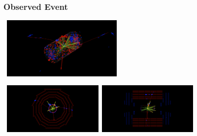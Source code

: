 \documentclass{beamer}
\begin{document}
\begin{frame}
\frametitle{Observed Event}
\begin{tcolorbox}[colback=UNL@Cream!5,colframe=UMN@Maroon!40,title=\textcolor{black}{\textbf{3-D View}}]
 \centering
\mbox{
\includegraphics[height=3cm,width= 0.7\paperwidth]{THESISPLOTS/Delayed_photon-Event-3D.png}} 
 \end{tcolorbox}
 
 \begin{tcolorbox}[colback=UNL@Cream!5,colframe=UMN@Maroon!40,title=\textcolor{black}{\textbf{Transverse~(left) and $\rho-Z$ (Right) View}}]
 \centering
\mbox{
\includegraphics[height=2.5cm,width=0.35\paperwidth]{THESISPLOTS/Delayed_photon_Event-Rho-Phi.png}
 \quad
\includegraphics[height=2.5cm,width=0.35\paperwidth]{THESISPLOTS/Delayed_photon_Event-Rho-Z.png}
} 
 \end{tcolorbox}

\end{frame}
\end{document}
